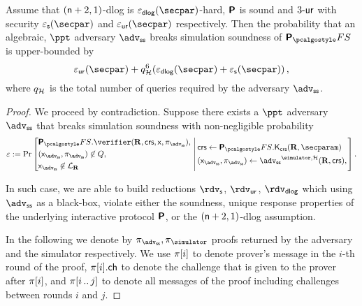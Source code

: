 \let\accentvec\vec \documentclass[runningheads,10pt]{llncs}
\begin{document}
	\begin{theorem}
		Assume that $(\mathsf{n} + 2, 1)$-dlog is $\eps_\dlog(\secpar)$-hard, $\bm{\mathsf{P}}$ is sound and ${3\text{-}\mathsf{ur}}$ with security $\epss(\secpar)$ and $\epsur(\secpar)$ respectively. 
		Then the probability that an algebraic, $\ppt$ adversary $\advss$ breaks simulation soundness of $\plonkprotfs$ is upper-bounded by 
		\[
			\epsur(\secpar) + q_\ro^6 (\eps_{\dlog}(\secpar) + \epss(\secpar))\,,
		\]
		where $q_{\mathcal{H}}$ is the total number of queries required by the adversary $\advss$.
	\end{theorem}
	\begin{proof}
		We proceed by contradiction. Suppose there exists a $\ppt$ adversary $\advss$ that breaks simulation soundness with non-negligible probability
		\[
		\eps := \Pr
			\left[
			\begin{aligned}
				& \plonkprotfs.\verifier(\REL, \crs, \inp, \zkproof_{\advss}),\\
				& (\inp_{\advss}, \zkproof_{\advss}) \not\in Q,\\
				& \inp_\advss \not\in \LANG_\REL 
			\end{aligned}
			\,\left|\, 
			\vphantom{\begin{aligned}
				& \plonkprotfs.\verifier(\REL, \crs, \inp, \zkproof_{\advss}),\\
				& (\inp_{\advss}, \zkproof_{\advss}) \not\in Q,\\
				& \inp_\advss \not\in \LANG_\REL 
			\end{aligned}}
			\begin{aligned}
				& \crs \gets \plonkprotfs.\kcrs(\REL, \secparam)\\
				& (\inp_{\advss}, \zkproof_{\advss}) \gets \advss^{\simulator, \ro} (\REL, \crs),		
			\end{aligned}
			\right.\right].
		\]

	In such case, we are able to build reductions $\rdvs$, $\rdvur$, $\rdvdlog$ which using $\advss$ as a black-box, violate either the soundness, unique response properties of the underlying interactive protocol $\bm{\mathsf{P}}$, or the $(\mathsf{n} + 2, 1)$-dlog assumption.

	In the following we denote by $\zkproof_{\advss}, \zkproof_{\simulator}$ proofs
	returned by the adversary and the simulator respectively. We use $\pi[i]$
	to denote prover's message in the $i$-th round of the proof, $\pi[i].\mathsf{ch}$
	to denote the challenge that is given to the prover after $\pi[i]$, and
	$\pi[i \, .. \, j]$ to denote all messages of the proof including challenges between rounds $i$ and $j$.


\end{proof}
\end{document}
